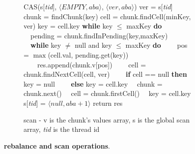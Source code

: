\begin{figure*}
\begin{center}
\begin{subfigure}[t]{.46\textwidth}
\begin{algorithmic}[1]{}
		\State CAS(s[\textit{tid}], $\langle EMPTY,aba\rangle$, $\langle ver,aba\rangle$) 
		\State ver = s[\textit{tid}]
		\State chunk = findChunk(key) 
		\State cell = chunk.findCell(minKey, ver) 
		\State key = cell.key
		\State \textbf{while} key $\leq$ maxKey \textbf{do} 
		\State \ \ pending = chunk.findInPending(key,maxKey)  
		\State \ \ \textbf{while} key $\neq$ null and key $\leq$ maxKey \textbf{do}
		\State \ \ \ \ pos = $\max$(cell.val, pending.get(key))
		\State \ \ \ \ res.append(chunk.v[pos]) 
		\State \ \ \ \ cell = chunk.findNextCell(cell, ver)
		\State \ \ \ \ \textbf{if} cell == null \textbf{then} key = null
		\State \ \ \ \ \textbf{else} key = cell.key %
		\Statex {}
		\State \ \ chunk = chunk.next()
		\State \ \ cell = chunk.firstCell()
		\State \ \ key = cell.key 
		\State s[\textit{tid}] = $\langle null,aba+1\rangle$ 
		\State return res
		\EndFunction
		\end{algorithmic}
		\caption{scan - v is the chunk's values array, s is the global scan array, \textit{tid} is the thread id
} \label{fig:scan}
	\end{subfigure}
	\end{center}
	\caption{{\bf {\kiwi} rebalance and scan operations}.
			\label{fig:rebalscan}}
\end{figure*}

